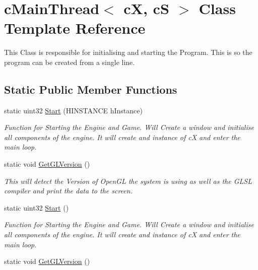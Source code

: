 \hypertarget{classc_main_thread}{
\section{cMainThread$<$ cX, cS $>$ Class Template Reference}
\label{classc_main_thread}
}


This Class is responsible for initialising and starting the Program. This is so the program can be created from a single line.  


\subsection*{Static Public Member Functions}
\begin{DoxyCompactItemize}
\item 
\hypertarget{classc_main_thread_a46319ac6fe2f17e5f8399e1a5ae04b2f}{
static uint32 \hyperlink{classc_main_thread_a46319ac6fe2f17e5f8399e1a5ae04b2f}{Start} (HINSTANCE hInstance)}
\label{classc_main_thread_a46319ac6fe2f17e5f8399e1a5ae04b2f}

\begin{DoxyCompactList}\small\item\em Function for Starting the Engine and Game. Will Create a window and initialise all components of the engine. It will create and instance of cX and enter the main loop. \end{DoxyCompactList}\item 
\hypertarget{classc_main_thread_a9b744fd9997b08998fb246221b945925}{
static void \hyperlink{classc_main_thread_a9b744fd9997b08998fb246221b945925}{GetGLVersion} ()}
\label{classc_main_thread_a9b744fd9997b08998fb246221b945925}

\begin{DoxyCompactList}\small\item\em This will detect the Version of OpenGL the system is using as well as the GLSL compiler and print the data to the screen. \end{DoxyCompactList}\item 
\hypertarget{classc_main_thread_af7a34c0a224a60eb9f1273b9f1e6ddcb}{
static uint32 \hyperlink{classc_main_thread_af7a34c0a224a60eb9f1273b9f1e6ddcb}{Start} ()}
\label{classc_main_thread_af7a34c0a224a60eb9f1273b9f1e6ddcb}

\begin{DoxyCompactList}\small\item\em Function for Starting the Engine and Game. Will Create a window and initialise all components of the engine. It will create and instance of cX and enter the main loop. \end{DoxyCompactList}\item 
\hypertarget{classc_main_thread_a9b744fd9997b08998fb246221b945925}{
static void \hyperlink{classc_main_thread_a9b744fd9997b08998fb246221b945925}{GetGLVersion} ()}
\label{classc_main_thread_a9b744fd9997b08998fb246221b945925}


\end{DoxyCompactItemize}
